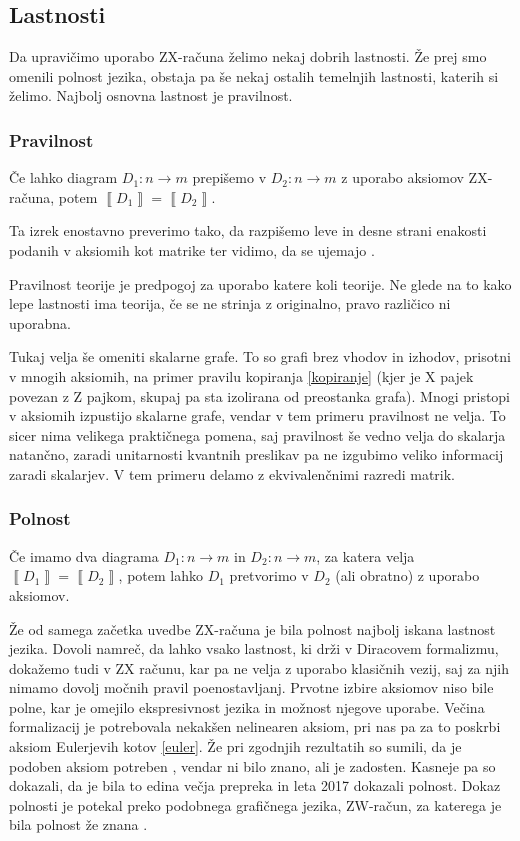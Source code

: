 \documentclass[mat1]{fmfdelo}
\newcommand{\interpret}[1]{\left\llbracket #1 \right\rrbracket}
\begin{document}
\subsection{Lastnosti}
Da upravičimo uporabo ZX-računa želimo nekaj dobrih lastnosti. Že prej smo omenili polnost jezika, obstaja pa še nekaj ostalih temelnjih lastnosti, katerih si želimo. Najbolj osnovna lastnost je pravilnost.
\subsubsection{Pravilnost}
\begin{izrek}[Pravilnost]
    Če lahko diagram \(D_1:n\to m\) prepišemo v \(D_2:n\to m\) z uporabo aksiomov ZX-računa, potem \(\interpret{D_1} = \interpret{D_2}\).
\end{izrek}
Ta izrek enostavno preverimo tako, da razpišemo leve in desne strani enakosti podanih v aksiomih kot matrike ter vidimo, da se ujemajo \cite[izrek 2.16]{Coecke_2011}.

Pravilnost teorije je predpogoj za uporabo katere koli teorije. Ne glede na to kako lepe lastnosti ima teorija, če se ne strinja z originalno, pravo različico ni uporabna.

Tukaj velja še omeniti skalarne grafe. To so grafi brez vhodov in izhodov, prisotni v mnogih aksiomih, na primer pravilu kopiranja \ref{kopiranje} (kjer je X pajek povezan z Z pajkom, skupaj pa sta izolirana od preostanka grafa). Mnogi pristopi v aksiomih izpustijo skalarne grafe, vendar v tem primeru pravilnost ne velja. To sicer nima velikega praktičnega pomena, saj pravilnost še vedno velja do skalarja natančno, zaradi unitarnosti kvantnih preslikav pa ne izgubimo veliko informacij zaradi skalarjev. V tem primeru delamo z ekvivalenčnimi razredi matrik.
\subsubsection{Polnost}
\begin{izrek}[Polnost]
    Če imamo dva diagrama \(D_1:n\to m\) in \(D_2:n\to m\), za katera velja \(\interpret{D_1} = \interpret{D_2}\), potem lahko \(D_1\) pretvorimo v \(D_2\) (ali obratno) z uporabo aksiomov.
\end{izrek}
Že od samega začetka uvedbe ZX-računa je bila polnost najbolj iskana lastnost jezika. Dovoli namreč, da lahko vsako lastnost, ki drži v Diracovem formalizmu, dokažemo tudi v ZX računu, kar pa ne velja z uporabo klasičnih vezij, saj za njih nimamo dovolj močnih pravil poenostavljanj. Prvotne izbire aksiomov niso bile polne, kar je omejilo ekspresivnost jezika in možnost njegove uporabe. Večina formalizacij je potrebovala nekakšen nelinearen aksiom, pri nas pa za to poskrbi aksiom Eulerjevih kotov \ref{euler}. Že pri zgodnjih rezultatih so sumili, da je podoben aksiom potreben \cite{Schr_der_de_Witt_2014}, vendar ni bilo znano, ali je zadosten. Kasneje pa so dokazali, da je bila to edina večja prepreka in leta 2017 dokazali polnost. Dokaz polnosti je potekal preko podobnega grafičnega jezika, ZW-račun, za katerega je bila polnost že znana \cite{kangfengng}. 
\end{document}
